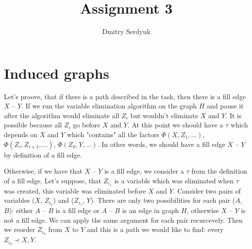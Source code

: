 \documentclass[a4paper]{article}
\author{Dmitry Serdyuk}
\title{Assignment 3}
\date{}
\begin{document}

\section{Induced graphs}

Let's proove, that if there is a path described in the task, then there is a fill edge $X$ -- $Y$.
If we run the variable elimination algorithm on the graph $H$ and pause it after the algorithm would
eliminate all $Z_i$ but wouldn't eliminate $X$ and $Y$. It is possible because all $Z_i$ go before
$X$ and $Y$. At this point we should have a $\tau$ which depends on $X$ and $Y$ which "contains" all
the factors $\Phi(X, Z_1, \ldots)$, $\Phi(Z_i, Z_{i+1}, \ldots)$, $\Phi(Z_k, Y, \ldots)$. In other
words, we should have a fill edge $X$ -- $Y$ by definition of a fill edge.


Otherwise, if we have that $X$ -- $Y$ is a fill edge, we consider a $\tau$ from the definition of
a fill edge. Let's suppose, that $Z_{i_1}$ is a variable which was eliminated when $\tau$ was created,
this variable was eliminated before $X$ and $Y$.
Consider two pairs of variables ($X$, $Z_{i_1}$) and ($Z_{i_1}$, $Y$). There are only two possibilities for
each pair ($A$, $B$): either $A$ -- $B$ is a fill edge or $A$ -- $B$ is an edge in graph $H$, otherwise
$X$ -- $Y$ is not a fill edge. We can apply the same argument for each pair recurcevely. Then we reorder 
$Z_{i_k}$ from $X$ to $Y$ and this is a path we would like to find: every $Z_{i_k} \prec X, Y$.
\end{document}

